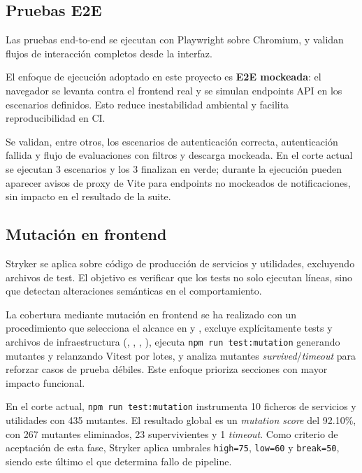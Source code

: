 \subsection{Pruebas E2E}

Las pruebas end-to-end se ejecutan con Playwright sobre Chromium,
y validan flujos de interacci\'on completos desde la interfaz.

El enfoque de ejecuci\'on adoptado en este proyecto es \textbf{E2E mockeada}:
el navegador se levanta contra el frontend real y se simulan endpoints API
en los escenarios definidos. Esto reduce inestabilidad ambiental y facilita
reproducibilidad en CI.

Se validan, entre otros, los escenarios de autenticaci\'on correcta, autenticaci\'on fallida y flujo de evaluaciones con filtros y descarga mockeada. En el corte actual se ejecutan 3 escenarios y los 3 finalizan en verde; durante la ejecuci\'on pueden aparecer avisos de proxy de Vite para endpoints no mockeados de notificaciones, sin impacto en el resultado de la suite.

\subsection{Mutaci\'on en frontend}

Stryker se aplica sobre c\'odigo de producci\'on de servicios y utilidades,
excluyendo archivos de test.
El objetivo es verificar que los tests no solo ejecutan l\'ineas,
sino que detectan alteraciones sem\'anticas en el comportamiento.

La cobertura mediante mutaci\'on en frontend se ha realizado con un procedimiento que selecciona el alcance en  y , excluye expl\'icitamente tests y archivos de infraestructura (, , , ), ejecuta \texttt{npm run test:mutation} generando mutantes y relanzando Vitest por lotes, y analiza mutantes \textit{survived}/\textit{timeout} para reforzar casos de prueba d\'ebiles. Este enfoque prioriza secciones con mayor impacto funcional.

En el corte actual, \texttt{npm run test:mutation} instrumenta 10 ficheros de servicios y utilidades con 435 mutantes. El resultado global es un \textit{mutation score} del 92.10\%, con 267 mutantes eliminados, 23 supervivientes y 1 \textit{timeout}. Como criterio de aceptaci\'on de esta fase, Stryker aplica umbrales \texttt{high=75}, \texttt{low=60} y \texttt{break=50}, siendo este \'ultimo el que determina fallo de pipeline.

